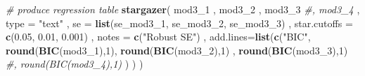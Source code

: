 \documentclass[]{article}
\newenvironment{Shaded}{\begin{snugshade}}{\end{snugshade}}
\newcommand{\CommentTok}[1]{\textcolor[rgb]{0.56,0.35,0.01}{\textit{#1}}}
\newcommand{\DataTypeTok}[1]{\textcolor[rgb]{0.13,0.29,0.53}{#1}}
\newcommand{\DecValTok}[1]{\textcolor[rgb]{0.00,0.00,0.81}{#1}}
\newcommand{\FloatTok}[1]{\textcolor[rgb]{0.00,0.00,0.81}{#1}}
\newcommand{\KeywordTok}[1]{\textcolor[rgb]{0.13,0.29,0.53}{\textbf{#1}}}
\newcommand{\NormalTok}[1]{#1}
\newcommand{\StringTok}[1]{\textcolor[rgb]{0.31,0.60,0.02}{#1}}
\begin{document}
\begin{Shaded}
\begin{Highlighting}[]
\CommentTok{# produce regression table}
\KeywordTok{stargazer}\NormalTok{(}
\NormalTok{    mod3_}\DecValTok{1}
\NormalTok{  , mod3_}\DecValTok{2}
\NormalTok{  , mod3_}\DecValTok{3}
  \CommentTok{#, mod3_4}
\NormalTok{  , }\DataTypeTok{type =} \StringTok{"text"}
\NormalTok{  , }\DataTypeTok{se =} \KeywordTok{list}\NormalTok{(se_mod3_}\DecValTok{1}\NormalTok{, se_mod3_}\DecValTok{2}\NormalTok{, se_mod3_}\DecValTok{3}\NormalTok{)}
\NormalTok{  , }\DataTypeTok{star.cutoffs =} \KeywordTok{c}\NormalTok{(}\FloatTok{0.05}\NormalTok{, }\FloatTok{0.01}\NormalTok{, }\FloatTok{0.001}\NormalTok{)}
\NormalTok{  , }\DataTypeTok{notes =} \KeywordTok{c}\NormalTok{(}\StringTok{"Robust SE"}\NormalTok{)}
\NormalTok{  , }\DataTypeTok{add.lines=}\KeywordTok{list}\NormalTok{(}\KeywordTok{c}\NormalTok{(}\StringTok{"BIC"}\NormalTok{, }\KeywordTok{round}\NormalTok{(}\KeywordTok{BIC}\NormalTok{(mod3_}\DecValTok{1}\NormalTok{),}\DecValTok{1}\NormalTok{), }\KeywordTok{round}\NormalTok{(}\KeywordTok{BIC}\NormalTok{(mod3_}\DecValTok{2}\NormalTok{),}\DecValTok{1}\NormalTok{) , }\KeywordTok{round}\NormalTok{(}\KeywordTok{BIC}\NormalTok{(mod3_}\DecValTok{3}\NormalTok{),}\DecValTok{1}\NormalTok{) }
                     \CommentTok{#, round(BIC(mod3_4),1)}
\NormalTok{                     )}
\NormalTok{                   )}
\NormalTok{  )}
\end{Highlighting}
\end{Shaded}
\end{document}
